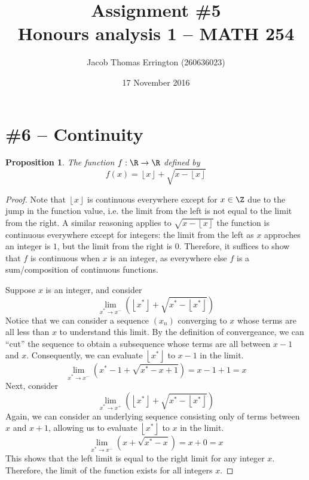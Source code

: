\documentclass[letterpaper,11pt]{article}
\author{Jacob Thomas Errington (260636023)}
\title{Assignment \#5\\Honours analysis 1 -- MATH 254}
\date{17 November 2016}
\newcommand{\floor}[1]{\left\lfloor#1\right\rfloor}
\newcommand{\parens}[1]{\left(#1\right)}
\newtheorem{prop}{Proposition}
\begin{document}
\maketitle

\section*{\#6 -- Continuity}

\begin{prop}
    The function $f : \R \to \R$ defined by
    \begin{equation*}
        f(x) = \floor{x} + \sqrt{x - \floor{x}}
    \end{equation*}
\end{prop}

\begin{proof}
    Note that $\floor{x}$ is continuous everywhere except for $x \in \Z$ due to
    the jump in the function value, i.e. the limit from the left is not equal
    to the limit from the right.
    A similar reasoning applies to $\sqrt{x - \floor{x}}$ the function is
    continuous everywhere except for integers: the limit from the left as $x$
    approches an integer is $1$, but the limit from the right is $0$.
    Therefore, it suffices to show that $f$ is continuous when $x$ is an
    integer, as everywhere else $f$ is a sum/composition of continuous
    functions.

    Suppose $x$ is an integer, and consider
    \begin{equation*}
        \lim_{x^* \to x^-}\parens{\floor{x^*} + \sqrt{x^* - \floor{x^*}}}
    \end{equation*}
    Notice that we can consider a sequence $(x_n)$ converging to $x$ whose
    terms are all less than $x$ to understand this limit. By the definition of
    convergeance, we can ``cut'' the sequence to obtain a subsequence whose
    terms are all between $x - 1$ and $x$.
    Consequently, we can evaluate $\floor{x^*}$ to $x - 1$ in the limit.
    \begin{equation*}
        \lim_{x^* \to x^-}\parens{x^* - 1 + \sqrt{x^* - x + 1}}
        = x - 1 + 1
        = x
    \end{equation*}
    Next, consider
    \begin{equation*}
        \lim_{x^* \to x^+}\parens{\floor{x^*} + \sqrt{x^* - \floor{x^*}}}
    \end{equation*}
    Again, we can consider an underlying sequence consisting only of terms
    between $x$ and $x + 1$, allowing us to evaluate $\floor{x^*}$ to $x$ in
    the limit.
    \begin{equation*}
        \lim_{x^* \to x^-}\parens{x + \sqrt{x^* - x}}
        = x + 0
        = x
    \end{equation*}
    This shows that the left limit is equal to the right limit for any integer
    $x$. Therefore, the limit of the function exists for all integers $x$.


\end{proof}
\end{document}
